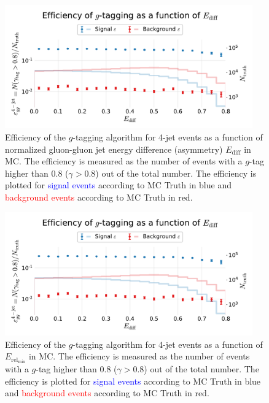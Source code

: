 \FloatBarrier
\newpage

\begin{figure}
  \centerfloat
  \includegraphics[width=0.95\textwidth, trim=10 10 10 45, clip, page=1]{figures/quarks/efficiency_events-down_sample=1.00-ML_vars=vertex-selection=b-ejet_min=4-n_iter_RS_lgb=99-n_iter_RS_xgb=9-cdot_cut=0.90-version=19-njet=4.pdf}
  \caption[$g$-Tagging Efficiency for 4-Jet Events in MC as a Function of $E_\mathrm{diff}$]
          {Efficiency of the $g$-tagging algorithm for 4-jet events as a function of normalized gluon-gluon jet energy difference (asymmetry) $E_\mathrm{diff}$  in MC. The efficiency is measured as the number of events with a $g$-tag higher than 0.8 ($\gamma > 0.8$) out of the total number. The efficiency is plotted for \textcolor{blue}{signal events} according to MC Truth in blue and \textcolor{red}{background events} according to MC Truth in red.
          } 
  \label{fig:q:effiency_gtag_E_diff}
\end{figure}
\begin{figure}
  \centerfloat
  \includegraphics[width=0.95\textwidth, trim=10 10 10 45, clip, page=2]{figures/quarks/efficiency_events-down_sample=1.00-ML_vars=vertex-selection=b-ejet_min=4-n_iter_RS_lgb=99-n_iter_RS_xgb=9-cdot_cut=0.90-version=19-njet=4.pdf}
  \caption[$g$-Tagging Efficiency for 4-Jet Events in MC as a Function of $E_{\mathrm{rel}_\mathrm{min}}$]
          {Efficiency of the $g$-tagging algorithm for 4-jet events as a function of $E_{\mathrm{rel}_\mathrm{min}}$ in MC. The efficiency is measured as the number of events with a $g$-tag higher than 0.8 ($\gamma > 0.8$) out of the total number. The efficiency is plotted for \textcolor{blue}{signal events} according to MC Truth in blue and \textcolor{red}{background events} according to MC Truth in red.
          } 
  \label{fig:q:effiency_gtag_E_rel_min}
\end{figure}
